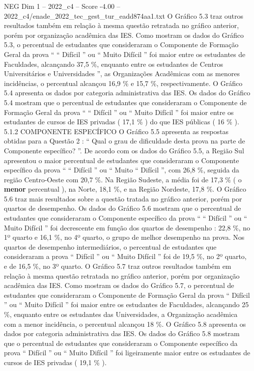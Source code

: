 \begin{textsample}{NEG Dim 1 – 2022\_c4 – Score -4.00 – 2022\_c4/enade\_2022\_tec\_gest\_tur\_eadd874aa1.txt}
O Gráfico 5.3 traz outros resultados também em relação à mesma questão retratada no gráfico anterior, porém por organização acadêmica das IES.
Como mostram os dados do Gráfico 5.3, o percentual de estudantes que consideraram o Componente de Formação Geral da prova “ “ Difícil ” ou “ Muito Difícil ” foi maior entre os estudantes de Faculdades, alcançando 37,5 \%, enquanto entre os estudantes de Centros Universitários e Universidades ”, as Organizações Acadêmicas com as menores incidências, o percentual alcançou 16,9 \% e 15,7 \%, respectivamente.
O Gráfico 5.4 apresenta os dados por categoria administrativa das IES.
Os dados do Gráfico 5.4 mostram que o percentual de estudantes que consideraram o Componente de Formação Geral da prova “ “ Difícil ” ou “ Muito Difícil ” foi maior entre os estudantes de cursos de IES privadas ( 17,1 \% ) do que IES públicas ( 16 \% ). 5.1.2 COMPONENTE ESPECÍFICO O Gráfico 5.5 apresenta as respostas obtidas para a Questão 2 : “ Qual o grau de dificuldade desta prova na parte de Componente específico? ”.
De acordo com os dados do Gráfico 5.5, a Região Sul apresentou o maior percentual de estudantes que consideraram o Componente específico da prova “ “ Difícil ” ou “ Muito “ Difícil ”, com 26,8 \%, seguida da região Centro-Oeste com 20,7 \%.
Na Região Sudeste, a média foi de 17,3 \% ( o \textbf{menor} percentual ), na Norte, 18,1 \%, e na Região Nordeste, 17,8 \%.
O Gráfico 5.6 traz mais resultados sobre a questão tratada no gráfico anterior, porém por quartos de desempenho.
Os dados do Gráfico 5.6 mostram que o percentual de estudantes que consideraram o Componente específico da prova “ “ Difícil ” ou “ Muito Difícil ” foi decrescente em função dos quartos de desempenho : 22,8 \%, no 1º quarto e 16,1 \%, no 4º quarto, o grupo de melhor desempenho na prova.
Nos quartos de desempenho intermediários, o percentual de estudantes que consideraram a prova “ Difícil ” ou “ Muito Difícil ” foi de 19,5 \%, no 2º quarto, e de 16,5 \%, no 3º quarto.
O Gráfico 5.7 traz outros resultados também em relação à mesma questão retratada no gráfico anterior, porém por organização acadêmica das IES.
Como mostram os dados do Gráfico 5.7, o percentual de estudantes que consideraram o Componente de Formação Geral da prova “ Difícil ” ou “ Muito Difícil ” foi maior entre os estudantes de Faculdades, alcançando 25 \%, enquanto entre os estudantes das Universidades, a Organização acadêmica com a menor incidência, o percentual alcançou 18 \%.
O Gráfico 5.8 apresenta os dados por categoria administrativa das IES.
Os dados do Gráfico 5.8 mostram que o percentual de estudantes que consideraram o Componente específico da prova “ Difícil ” ou “ Muito Difícil ” foi ligeiramente maior entre os estudantes de cursos de IES privadas ( 19,1 \% ).

\end{textsample}
